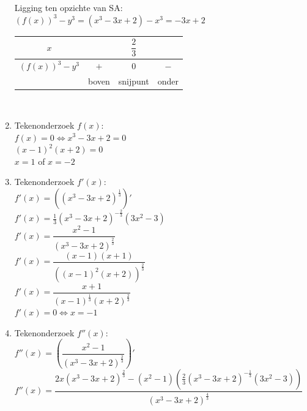 \documentclass[a4paper]{article}
\begin{document}
\begin{enumerate}
    Ligging ten opzichte van SA:\\
    
    $(f(x))^3 - y^3 = (x^3-3x+2) - x^3 = -3x+2$\\
    
    \begin{tabular}{c|ccc}
    $x$ & & $\dfrac{2}{3}$ & \\ \hline
    $(f(x))^3-y^3$ & $+$ & $0$ & $-$ \\ \hline
    & boven & snijpunt & onder
    \end{tabular} \\

    \item Tekenonderzoek $f(x)$:\\
    
    $f(x) = 0 \Leftrightarrow x^3 - 3x + 2 = 0$\\
    
    $(x-1)^2(x+2) = 0$\\
    
    $x = 1 $ of $ x = -2$\\

    \item Tekenonderzoek $f'(x)$:\\
    
    $f'(x) = \left((x^3-3x+2)^{\tfrac{1}{3}}\right)'$\\
    
    $f'(x) = \tfrac{1}{3}(x^3-3x+2)^{-\tfrac{2}{3}}(3x^2-3)$\\
    
    $f'(x) = \dfrac{x^2-1}{(x^3-3x+2)^{\tfrac{2}{3}}}$\\
    
    $f'(x) = \dfrac{(x-1)(x+1)}{((x-1)^2(x+2))^{\tfrac{2}{3}}}$\\
    
    $f'(x) = \dfrac{x+1}{(x-1)^{\tfrac{1}{3}}(x+2)^{\tfrac{2}{3}}}$\\
    
    $f'(x) = 0 \Leftrightarrow x = -1$\\

    \item Tekenonderzoek $f''(x)$:\\
    
    $f''(x) = \left( \dfrac{x^2-1}{(x^3-3x+2)^{\tfrac{2}{3}}} \right)'$\\
    
    $f''(x) = \dfrac{2x(x^3-3x+2)^{\tfrac{2}{3}} - (x^2-1)\left(\tfrac{2}{3}(x^3-3x+2)^{-\tfrac{1}{3}}(3x^2-3)\right)}{(x^3-3x+2)^{\tfrac{4}{3}}}$\\
    

\end{enumerate}
\end{document}
